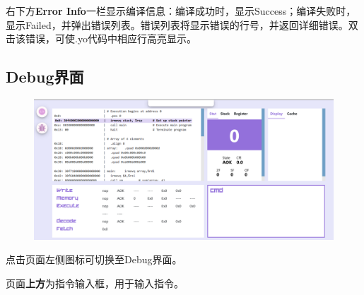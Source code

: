 \documentclass[12pt]{article} %
\begin{document}
\begin{sloppypar}
右下方{\bf Error Info}一栏显示编译信息：编译成功时，显示Success；编译失败时，显示Failed，并弹出错误列表。错误列表将显示错误的行号，并返回详细错误。双击该错误，可使.yo代码中相应行高亮显示。

\clearpage
\subsection{Debug界面}

\begin{figure}[htbp]
\begin{center}
\includegraphics[width=\linewidth]{asset/6.png}
\end{center}
\end{figure}

点击页面左侧图标可切换至Debug界面。


页面{\bf 上方}为指令输入框，用于输入指令。



\end{sloppypar}
\end{document}

